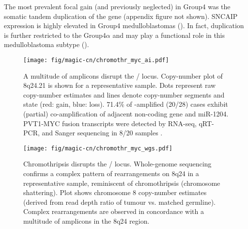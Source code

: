 The most prevalent focal gain (and previously neglected) in Group4 was the somatic tandem duplication of the  gene (appendix figure not shown). SNCAIP expression is highly elevated in Group4 medulloblastomas (). In fact,  duplication is further restricted to the Group4$\alpha$ and may play a functional role in this medulloblastoma subtype ().


\clearpage


\begin{figure}[t]
	\begin{center}
		\texttt{[image: fig/magic-cn/chromothr\_myc\_ai.pdf]}
	\end{center}
	\caption[A multitude of amplicons disrupt the / locus]
	{
	A multitude of amplicons disrupt the / locus.
	Copy-number plot of 8q24.21 is shown for a representative sample. Dots represent raw copy-number estimates and lines denote copy-number segments and state (red: gain, blue: loss). 71.4\% of -amplified (20/28) cases exhibit (partial) co-amplification of adjacent non-coding  gene and miR-1204. PVT1-MYC fusion transcripts were detected by RNA-seq, qRT-PCR, and Sanger sequencing in 8/20 samples .
	}
	\label{fig:chromothr_myc}
\end{figure}

\begin{figure}[b]
	\begin{center}
		\texttt{[image: fig/magic-cn/chromothr\_myc\_wgs.pdf]}
	\end{center}
	\caption[Chromothripsis disrupts the / locus.]
	{
	Chromothripsis disrupts the / locus.
	Whole-genome sequencing confirms a complex pattern of rearrangements on 8q24 in a representative sample, reminiscent of chromothripsis (chromosome shattering).
	Plot shows chromosome 8 copy-number estimates (derived from read depth ratio of tumour vs. matched germline).
	Complex rearrangements are observed in concordance with a multitude of amplicons in the 8q24 region.
	}
	\label{fig:chromothr_myc_wgs}
\end{figure}

\clearpage

